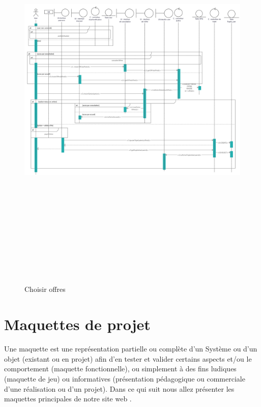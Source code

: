 \documentclass[a4paper]{report}
\begin{document}
\begin{spacing}{2}
\begin{itemize}
\begin{figure}[!ht]
\begin{center}
\includegraphics[angle=90,height=20cm]{Projet_JEE/SDchoisirOffre.jpg}
\end{center}
\caption[Choisir offres]{Choisir offres}
\end{figure}

\end{itemize}


\chapter{Maquettes de projet}
	
Une maquette est une représentation partielle ou complète d'un Système ou d'un objet (existant ou en projet) afin d'en tester et valider certains aspects et/ou le comportement (maquette fonctionnelle), ou simplement à des fins ludiques (maquette de jeu) ou informatives (présentation pédagogique ou commerciale d'une réalisation ou d'un projet).
Dans ce qui suit nous allez présenter les maquettes principales de notre site web .



\end{spacing}
\end{document}
